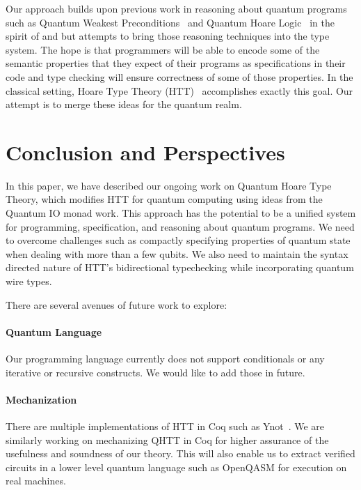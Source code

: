 \documentclass[acmsmall,nonacm,timestamp,review=false,anonymous=false]{acmart}
\begin{document}
Our approach builds upon previous work in reasoning about quantum programs such as Quantum Weakest Preconditions~\cite{dhondt_quantum_2006} and Quantum Hoare Logic~\cite{ying_floydhoare_2012} in the spirit of \citet{hoare_axiomatic_1969} and \citet{dijkstra_discipline_1976} but attempts to bring those reasoning techniques into the type system. The hope is that programmers will be able to encode some of the semantic properties that they expect of their programs as specifications in their code and type checking will ensure correctness of some of those properties. In the classical setting, Hoare Type Theory (HTT)~\cite{nanevski_hoare_2008} accomplishes exactly this goal. Our attempt is to merge these ideas for the quantum realm.


\section{Conclusion and Perspectives}
\label{sec:conclusion}
In this paper, we have described our ongoing work on Quantum Hoare Type Theory, which modifies HTT for quantum computing using ideas from the Quantum IO monad work. This approach has the potential to be a unified system for programming, specification, and reasoning about quantum programs. We need to overcome challenges such as compactly specifying properties of quantum state when dealing with more than a few qubits. We also need to maintain the syntax directed nature of HTT's bidirectional typechecking while incorporating quantum wire types.

There are several avenues of future work to explore:

\paragraph{Quantum Language} Our programming language currently does not support conditionals or any iterative or recursive constructs. We would like to add those in future.

\paragraph{Mechanization} There are multiple implementations of HTT in Coq such as Ynot~\cite{ynot2008}. We are similarly working on mechanizing QHTT in Coq for higher assurance of the usefulness and soundness of our theory. This will also enable us to extract verified circuits in a lower level quantum language such as OpenQASM for execution on real machines.
\end{document}
